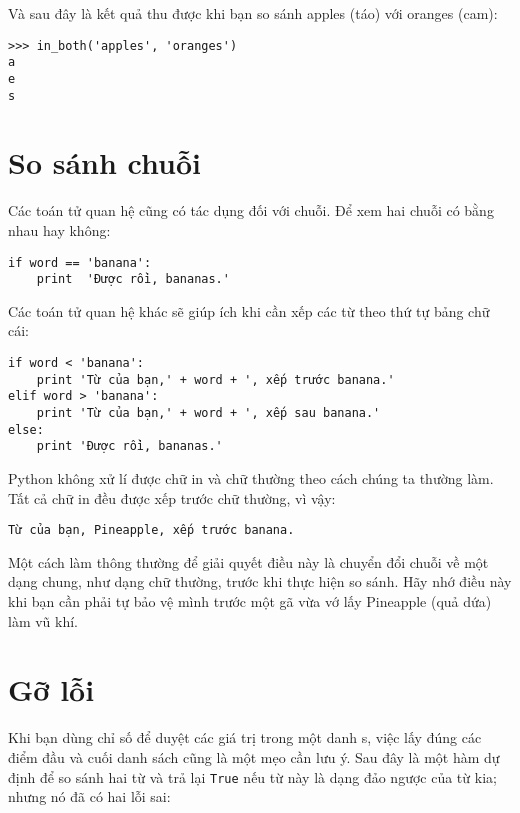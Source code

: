 \documentclass[11pt]{book}
\begin{document}
Và sau đây là kết quả thu được khi bạn so sánh apples (táo) với
oranges (cam):

\beforeverb
\begin{verbatim}
>>> in_both('apples', 'oranges')
a
e
s
\end{verbatim}
\afterverb
%

\section{So sánh chuỗi}


Các toán tử quan hệ cũng có tác dụng đối với chuỗi. Để xem hai chuỗi
có bằng nhau hay không:

\beforeverb
\begin{verbatim}
if word == 'banana':
    print  'Được rồi, bananas.'
\end{verbatim}
\afterverb
%
Các toán tử quan hệ khác sẽ giúp ích khi cần xếp các từ theo thứ tự bảng chữ
cái:

\beforeverb
\begin{verbatim}
if word < 'banana':
    print 'Từ của bạn,' + word + ', xếp trước banana.'
elif word > 'banana':
    print 'Từ của bạn,' + word + ', xếp sau banana.'
else:
    print 'Được rồi, bananas.'
\end{verbatim}
\afterverb
%
Python không xử lí được chữ in và chữ thường theo cách chúng ta thường làm.
Tất cả chữ in đều được xếp trước chữ thường, vì vậy:

\beforeverb
\begin{verbatim}
Từ của bạn, Pineapple, xếp trước banana.
\end{verbatim}
\afterverb
%
Một cách làm thông thường để giải quyết điều này là chuyển đổi chuỗi
về một dạng chung, như dạng chữ thường, trước khi thực hiện so sánh.
Hãy nhớ điều này khi bạn cần phải tự bảo vệ mình trước một gã vừa vớ lấy
Pineapple (quả dứa) làm vũ khí.


\section{Gỡ lỗi}


Khi bạn dùng chỉ số để duyệt các giá trị trong một danh s, việc lấy
đúng các điểm đầu và cuối danh sách cũng là một mẹo cần lưu ý. Sau đây
là một hàm dự định để so sánh hai từ và trả lại {\tt True} 
nếu từ này là dạng đảo ngược của từ kia; nhưng nó đã có hai lỗi sai:
\end{document}
